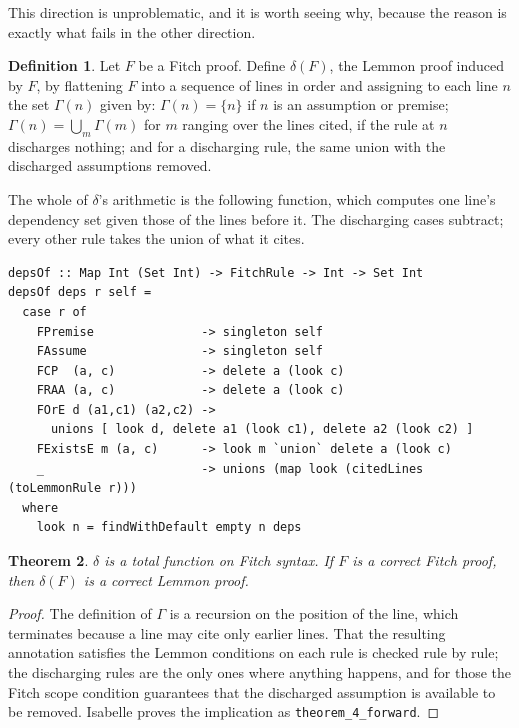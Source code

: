 \documentclass[11pt]{article}
\theoremstyle{plain}
\newtheorem{theorem}{Theorem}
\theoremstyle{definition}
\newtheorem{definition}[theorem]{Definition}
\theoremstyle{remark}
\begin{document}
This direction is unproblematic, and it is worth seeing why, because the
reason is exactly what fails in the other direction.

\begin{definition}
Let $F$ be a Fitch proof. Define $\delta(F)$, the Lemmon proof induced by $F$,
by flattening $F$ into a sequence of lines in order and assigning to each line
$n$ the set $\Gamma(n)$ given by: $\Gamma(n) = \{n\}$ if $n$ is an assumption
or premise; $\Gamma(n) = \bigcup_{m} \Gamma(m)$ for $m$ ranging over the lines
cited, if the rule at $n$ discharges nothing; and for a discharging rule,
the same union with the discharged assumptions removed.
\end{definition}

The whole of $\delta$'s arithmetic is the following function, which computes
one line's dependency set given those of the lines before it. The
discharging cases subtract; every other rule takes the union of what it cites.

\begin{lstlisting}
depsOf :: Map Int (Set Int) -> FitchRule -> Int -> Set Int
depsOf deps r self =
  case r of
    FPremise               -> singleton self
    FAssume                -> singleton self
    FCP  (a, c)            -> delete a (look c)
    FRAA (a, c)            -> delete a (look c)
    FOrE d (a1,c1) (a2,c2) ->
      unions [ look d, delete a1 (look c1), delete a2 (look c2) ]
    FExistsE m (a, c)      -> look m `union` delete a (look c)
    _                      -> unions (map look (citedLines (toLemmonRule r)))
  where
    look n = findWithDefault empty n deps
\end{lstlisting}

\begin{theorem}\label{thm:total}
$\delta$ is a total function on Fitch syntax. If $F$ is a correct Fitch proof,
then $\delta(F)$ is a correct Lemmon proof.
\end{theorem}

\begin{proof}
The definition of $\Gamma$ is a recursion on the position of the line, which
terminates because a line may cite only earlier lines. That the resulting
annotation satisfies the Lemmon conditions on each rule is checked rule by
rule; the discharging rules are the only ones where anything happens, and for
those the Fitch scope condition guarantees that the discharged assumption is
available to be removed.  Isabelle proves the implication as
\verb|theorem_4_forward|.
\end{proof}
\end{document}
